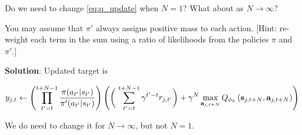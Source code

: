 Do we need to change \eqref{eq:q_update} when $N=1$? What about as $N\to\infty$? 

You may assume that $\pi'$ always assigns positive mass to each action. [Hint: re-weight each term in the sum using a ratio of likelihoods from the policies $\pi$ and $\pi'$.]

\textbf{Solution}: Updated target is 

\[
  y_{j,t} \gets \left(\prod_{t'=t}^{t+N-1}\frac{\pi(a_{t'}|s_{t'})}{\pi'(a_{t'}|s_{t'})}\right)\left(\biggl(\;\sum_{t'=t}^{t+N-1} \gamma^{t'-t} r_{j,t'}\biggr)+\gamma^{N} \max _{\mathbf{a}_{j,t+N}} Q_{\phi_k}\left(\mathbf{s}_{j,t+N}, \mathbf{a}_{j,t+N}\right)\right) \\
\]

We do need to change it for $N \to \infty$, but not $N=1$.

 
\ifsolutions\solve\thesubsection\else
\fi

\endgroup

